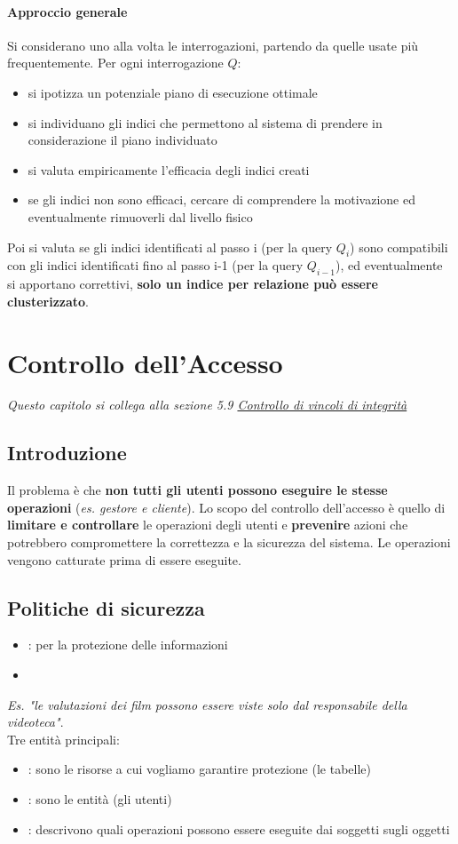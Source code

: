 \documentclass[12pt, a4paper]{report}
\begin{document}
    \subsubsection{Approccio generale}
    Si considerano uno alla volta le interrogazioni, partendo da quelle usate più frequentemente. Per ogni interrogazione $Q$:
    \begin{itemize}
        \item si ipotizza un potenziale piano di esecuzione ottimale
        \item si individuano gli indici che permettono al sistema di prendere in considerazione il piano individuato
        \item si valuta empiricamente l'efficacia degli indici creati
        \item se gli indici non sono efficaci, cercare di comprendere la motivazione ed eventualmente rimuoverli dal livello fisico
    \end{itemize}
    Poi si valuta se gli indici identificati al passo i (per la
    query $Q_{i}$) sono compatibili con gli indici
    identificati fino al passo i-1 (per la query $Q_{i-1}$), ed
    eventualmente si apportano correttivi, \textbf{solo un indice per relazione può essere clusterizzato}.
    \chapter{Controllo dell'Accesso}
    \textit{Questo capitolo si collega alla sezione 5.9 \hyperref[sec:5.9]{Controllo di vincoli di integrità}}
    \section{Introduzione}
    Il problema è che \textbf{non tutti gli utenti possono eseguire le stesse operazioni} (\textit{es. gestore e cliente}). Lo scopo del controllo dell'accesso è quello di \textbf{limitare e controllare} le operazioni degli utenti e \textbf{prevenire} azioni che potrebbero compromettere la correttezza e la sicurezza del sistema. Le operazioni vengono catturate prima di essere eseguite.
    \section{Politiche di sicurezza}
    \begin{itemize}
        \item {}: per la protezione delle informazioni
        \item {}
    \end{itemize}
    \textit{Es. "le valutazioni dei film possono essere viste solo dal responsabile della videoteca"}.\\
    Tre entità principali:
    \begin{itemize}
        \item {}: sono le risorse a cui vogliamo garantire protezione (le tabelle)
        \item {}: sono le entità (gli utenti)
        \item {}: descrivono quali operazioni possono essere eseguite dai soggetti sugli oggetti
    \end{itemize}
\end{document}
